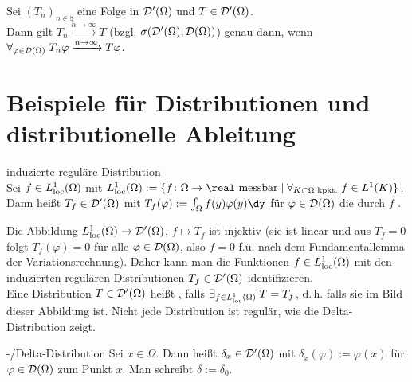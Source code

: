 \begin{Bem}
    Sei $(T_n)_{n \in \natural}$ eine Folge in $\mathcal{D}'(\Omega)$ und $T \in \mathcal{D}'(\Omega)$.\\
    Dann gilt $T_n \xrightarrow{n \to \infty} T$ (bzgl. $\sigma(\mathcal{D}'(\Omega), \mathcal{D}(\Omega))$)
    genau dann, wenn $\forall_{\varphi \in \mathcal{D}(\Omega)}\;
    T_n \varphi \xrightarrow{n \to \infty} T \varphi$.
\end{Bem}

\pagebreak

\section{%
    Beispiele für Distributionen und distributionelle Ableitung%
}

\begin{Def}{induzierte reguläre Distribution}\\
    Sei $f \in L^1_{\text{loc}}(\Omega)$
    mit $L^1_\loc(\Omega) := \{f\colon \Omega \rightarrow \real \text{ messbar} \;|\;
    \forall_{K \subset \Omega \text{ kpkt.}}\; f \in L^1(K)\}$.\\
    Dann heißt $T_f \in \mathcal{D}'(\Omega)$ mit $T_f(\varphi) := \int_\Omega f(y)\varphi(y)\dy$
    für $\varphi \in \mathcal{D}(\Omega)$
    die durch $f$ .
\end{Def}

\begin{Bem}
    Die Abbildung $L^1_{\text{loc}}(\Omega) \rightarrow \mathcal{D}'(\Omega)$, $f \mapsto T_f$ ist injektiv
    (sie ist linear und aus $T_f = 0$ folgt $T_f(\varphi) = 0$ für alle $\varphi \in \mathcal{D}(\Omega)$,
    also $f = 0$ f.ü. nach dem Fundamentallemma der Variationsrechnung).
    Daher kann man die Funktionen $f \in L^1_{\text{loc}}(\Omega)$ mit den
    induzierten regulären Distributionen $T_f \in \mathcal{D}'(\Omega)$ identifizieren.\\
    Eine Distribution $T \in \mathcal{D}'(\Omega)$ heißt ,
    falls $\exists_{f \in L^1_{\text{loc}}(\Omega)}\; T = T_f$,
    d.\,h. falls sie im Bild dieser Abbildung ist.
    Nicht jede Distribution ist regulär, wie die Delta-Distribution zeigt.
\end{Bem}

\begin{Def}{-/Delta-Distribution}
    Sei $x \in \Omega$.
    Dann heißt $\delta_x \in \mathcal{D}'(\Omega)$ mit $\delta_x(\varphi) := \varphi(x)$ für
    $\varphi \in \mathcal{D}(\Omega)$  zum Punkt $x$.
    Man schreibt $\delta := \delta_0$.
\end{Def}

